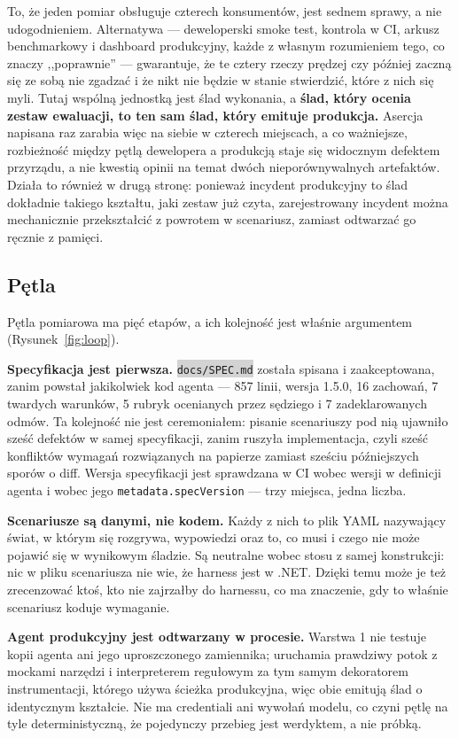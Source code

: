 \documentclass[11pt,a4paper]{article}
\newcommand{\repopath}[1]{\colorbox{lightgray}{\texttt{#1}}}
\newcommand{\finding}[1]{{\color{primaryblue}\textbf{#1}}}
\begin{document}
To, że jeden pomiar obsługuje czterech konsumentów, jest sednem sprawy, a nie
udogodnieniem. Alternatywa --- deweloperski smoke test, kontrola w CI, arkusz
benchmarkowy i dashboard produkcyjny, każde z własnym rozumieniem tego, co znaczy
,,poprawnie'' --- gwarantuje, że te cztery rzeczy prędzej czy później zaczną się
ze sobą nie zgadzać i że nikt nie będzie w stanie stwierdzić, które z nich się
myli. Tutaj wspólną jednostką jest ślad wykonania, a \finding{ślad, który
ocenia zestaw ewaluacji, to ten sam ślad, który emituje produkcja.} Asercja
napisana raz zarabia więc na siebie w czterech miejscach, a co ważniejsze,
rozbieżność między pętlą dewelopera a produkcją staje się widocznym defektem
przyrządu, a nie kwestią opinii na temat dwóch nieporównywalnych artefaktów.
Działa to również w drugą stronę: ponieważ incydent produkcyjny to ślad dokładnie
takiego kształtu, jaki zestaw już czyta, zarejestrowany incydent można
mechanicznie przekształcić z powrotem w scenariusz, zamiast odtwarzać go ręcznie
z pamięci.

\subsection{Pętla}

Pętla pomiarowa ma pięć etapów, a ich kolejność jest właśnie argumentem
(Rysunek~\ref{fig:loop}).

\textbf{Specyfikacja jest pierwsza.} \repopath{docs/SPEC.md} została spisana i
zaakceptowana, zanim powstał jakikolwiek kod agenta --- 857 linii, wersja 1.5.0,
16 zachowań, 7 twardych warunków, 5 rubryk ocenianych przez sędziego i 7 zadeklarowanych
odmów. Ta kolejność nie jest ceremoniałem: pisanie scenariuszy pod nią ujawniło
sześć defektów w samej specyfikacji, zanim ruszyła implementacja, czyli sześć
konfliktów wymagań rozwiązanych na papierze zamiast sześciu późniejszych sporów
o diff. Wersja specyfikacji jest sprawdzana w CI wobec wersji w definicji agenta
i wobec jego \texttt{metadata.specVersion} --- trzy miejsca, jedna liczba.

\textbf{Scenariusze są danymi, nie kodem.} Każdy z nich to plik YAML nazywający
świat, w którym się rozgrywa, wypowiedzi oraz to, co musi i czego nie może
pojawić się w wynikowym śladzie. Są neutralne wobec stosu z samej konstrukcji:
nic w pliku scenariusza nie wie, że harness jest w .NET. Dzięki temu może je
też zrecenzować ktoś, kto nie zajrzałby do harnessu, co ma znaczenie, gdy to
właśnie scenariusz koduje wymaganie.

\textbf{Agent produkcyjny jest odtwarzany w procesie.} Warstwa 1 nie testuje
kopii agenta ani jego uproszczonego zamiennika; uruchamia prawdziwy potok z
mockami narzędzi i interpreterem regułowym za tym samym dekoratorem
instrumentacji, którego używa ścieżka produkcyjna, więc obie emitują ślad o
identycznym kształcie. Nie ma credentiali ani wywołań modelu, co czyni pętlę na
tyle deterministyczną, że pojedynczy przebieg jest werdyktem, a nie próbką.
\end{document}
